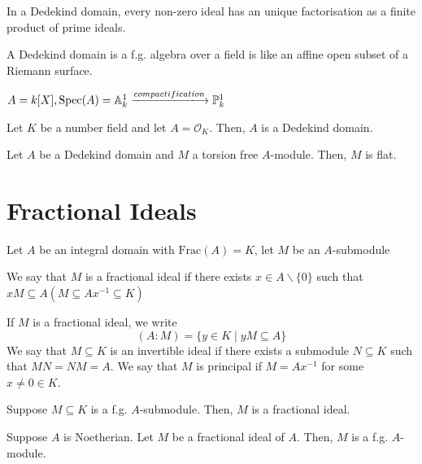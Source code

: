 \documentclass[oneside, 12pt]{scrbook}
\newcommand{\spec}{\mathrm{Spec}}
\newcommand{\Aa}{\mathbb{A}}
\newcommand{\PP}{\mathbb{P}}
\newcommand{\bs}{\backslash}
\theoremstyle{theorem}
\begin{document}
\begin{corollary}
In a Dedekind domain, every non-zero ideal has an unique factorisation as a finite product of prime ideals.
\end{corollary}

\begin{remark}
A Dedekind domain is a f.g. algebra over a field is like an affine open subset of a Riemann surface.
\end{remark}

\begin{example}
$A= k [X], \spec(A) = \Aa_{k}^{1} \xlongrightarrow{compactification} \PP^1_{k}$
\end{example}

\begin{proposition}
Let $K$ be a number field and let $A = \mathcal{O}_{K}$. Then, $A$ is a Dedekind domain.
\end{proposition}

\begin{corollary}
Let $A$ be a Dedekind domain and $M$ a torsion free $A$-module. Then, $M$ is flat.
\end{corollary}

\section{Fractional Ideals}

Let $A$ be an integral domain with $\mathrm{Frac}(A)=K$, let $M$ be an $A$-submodule 
\begin{definition}
We say that $M$ is a fractional ideal if there exists $x \in A \bs \{0\}$ such that $xM \subseteq A (M \subseteq Ax^{-1} \subseteq K)$
\end{definition}

If $M$ is a fractional ideal, we write $$(A:M) = \{y \in K\mid yM \subseteq A\}$$
We say that $M \subseteq K$ is an invertible ideal if there exists a submodule $N \subseteq K$ such that $MN=NM=A$. We say that $M$ is principal if $M = Ax^{-1}$ for some $x \neq 0 \in K$.

\begin{proposition}
Suppose $M \subseteq K$ is a f.g. $A$-submodule. Then, $M$ is a fractional ideal.
\end{proposition}

\begin{proposition}
Suppose $A$ is Noetherian. Let $M$ be a fractional ideal of $A$. Then, $M$ is a f.g. $A$-module.
\end{proposition}
\end{document}
